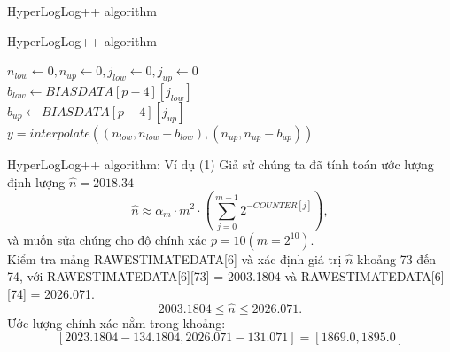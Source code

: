 \documentclass[10pt]{beamer}
\begin{document}
\begin{frame}{HyperLogLog++ algorithm}
\end{frame}
\begin{frame}{HyperLogLog++ algorithm}
  \begin{algorithm}[H]
    \vspace{0.25cm}
    \DontPrintSemicolon
    \LinesNumberedHidden
    \caption[]{Correcting bias in \textit{HyperLogLog++}}
    $n_{low} \gets 0, n_{up} \gets 0, j_{low} \gets 0, j_{up} \gets 0 $\\
    $b_{low} \gets BIASDATA[p-4][j_{low}]$\\
    $b_{up} \gets BIASDATA[p-4][j_{up}]$\\
    $y = interpolate\left(\left(n_{low}, n_{low} - b_{low}\right), \left(n_{up}, n_{up} - b_{up
    }\right)\right)$\\
    \vspace{0.25cm}
\end{algorithm}
\end{frame}
\begin{frame}{HyperLogLog++ algorithm: Ví dụ (1)}
  Giả sử chúng ta đã tính toán ước lượng định lượng $\hat{n} = 2018.34$
  \[
  \hat{n} \approx \alpha_m \cdot m^2 \cdot \left(\sum_{j=0}^{m-1}2^{-COUNTER[j]}\right),
  \]
  và muốn sửa chúng cho 
  độ chính xác $p = 10 (m = 2^{10})$.\\
  Kiểm tra mảng RAWESTIMATEDATA[6] và xác định giá trị $\hat{n}$ khoảng 73 đến 74,
  với RAWESTIMATEDATA[6][73] = 2003.1804 và
  RAWESTIMATEDATA[6][74] = 2026.071.
  \[2003.1804 \le \hat{n} \le 2026.071.\]
  Ước lượng chính xác nằm trong khoảng:
  \[\left[2023.1804 - 134.1804, 2026.071 - 131.071\right] = \left[1869.0, 1895.0\right]\]
\end{frame}
\end{document}
